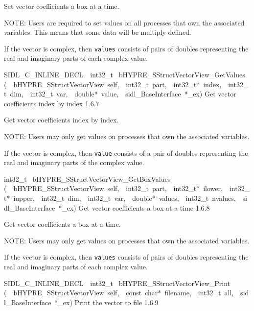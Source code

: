 \documentclass{article}
\begin{document}
\begin{cxxentry}
\begin{cxxentry}
\begin{cxxfunction}
\begin{cxxdoc}
Set vector coefficients a box at a time.

NOTE: Users are required to set values on all processes that
own the associated variables.  This means that some data will
be multiply defined.

If the vector is complex, then {\tt values} consists of pairs
of doubles representing the real and imaginary parts of each
complex value.
\end{cxxdoc}
\end{cxxfunction}
\begin{cxxfunction}
{SIDL\_C\_INLINE\_DECL\ \ int32\_t\ }
        {bHYPRE\_SStructVectorView\_GetValues}
        {(\ \ bHYPRE\_SStructVectorView\ self,\ \ int32\_t\ part,\ \ int32\_t*\ index,\ \ int32\_t\ dim,\ \ int32\_t\ var,\ \ double*\ value,\ \ sidl\_BaseInterface\ *\_ex)}
        {
Get vector coefficients index by index}
        {1.6.7}
\begin{cxxdoc}

Get vector coefficients index by index.

NOTE: Users may only get values on processes that own the
associated variables.

If the vector is complex, then {\tt value} consists of a pair
of doubles representing the real and imaginary parts of the
complex value.
\end{cxxdoc}
\end{cxxfunction}
\begin{cxxfunction}
{int32\_t\ }
        {bHYPRE\_SStructVectorView\_GetBoxValues}
        {(\ \ bHYPRE\_SStructVectorView\ self,\ \ int32\_t\ part,\ \ int32\_t*\ ilower,\ \ int32\_t*\ iupper,\ \ int32\_t\ dim,\ \ int32\_t\ var,\ \ double*\ values,\ \ int32\_t\ nvalues,\ \ sidl\_BaseInterface\ *\_ex)}
        {
Get vector coefficients a box at a time}
        {1.6.8}
\begin{cxxdoc}

Get vector coefficients a box at a time.

NOTE: Users may only get values on processes that own the
associated variables.

If the vector is complex, then {\tt values} consists of pairs
of doubles representing the real and imaginary parts of each
complex value.
\end{cxxdoc}
\end{cxxfunction}
\begin{cxxfunction}
{SIDL\_C\_INLINE\_DECL\ \ int32\_t\ }
        {bHYPRE\_SStructVectorView\_Print}
        {(\ \ bHYPRE\_SStructVectorView\ self,\ \ const\ char*\ filename,\ \ int32\_t\ all,\ \ sidl\_BaseInterface\ *\_ex)}
        {
Print the vector to file}
        {1.6.9}
\begin{cxxdoc}


\end{cxxdoc}
\end{cxxfunction}
\end{cxxentry}
\end{cxxentry}
\end{document}
